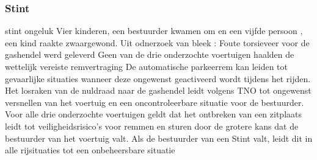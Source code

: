 \documentclass{article}
\begin{document}
	\subsubsection{Stint}
	\newline \indent  stint ongeluk
	Vier kinderen, een bestuurder kwamen om en een vijfde persoon , een kind raakte zwaargewond. Uit odnerzoek van bleek :
	Foute torsieveer voor de gashendel werd geleverd
	Geen van de drie onderzochte voertuigen haalden de wettelijk vereiste remvertraging
	De automatische parkeerrem kan leiden tot gevaarlijke situaties wanneer deze ongewenst geactiveerd wordt tijdens het rijden. 
	Het losraken van de nuldraad naar de gashendel leidt volgens TNO tot ongewenst versnellen van het voertuig en een oncontroleerbare situatie voor de bestuurder.
	Voor alle drie onderzochte voertuigen geldt dat het ontbreken van een zitplaats leidt tot veiligheidsrisico’s voor remmen en sturen door de grotere kans dat de bestuurder van het voertuig valt. Als de bestuurder van een Stint valt, leidt dit in alle rijsituaties tot een onbeheersbare situatie
	\cite{TNOStint}
\end{document}
